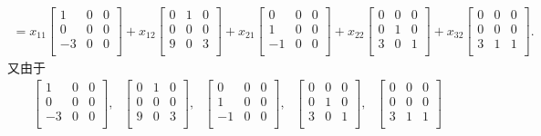 \documentclass[11pt,a4paper,openany,oneside]{book}
\begin{document}
\begin{gather*}
=x_{11}
\begin{bmatrix}
1 &  0  &  0  \\
0 &  0  &  0  \\
-3 &  0  &  0  \\
\end{bmatrix}
+x_{12}
\begin{bmatrix}
0 &  1  &  0  \\
0 &  0  &  0  \\
9 &  0  &  3  \\
\end{bmatrix}
+x_{21}
\begin{bmatrix}
0 &  0  &  0  \\
1 &  0  &  0  \\
-1&  0  &  0  \\
\end{bmatrix}
+x_{22}
\begin{bmatrix}
0 &  0  &  0  \\
0 &  1  &  0  \\
3 &  0  &  1  \\
\end{bmatrix}
+x_{32}
\begin{bmatrix}
0 &  0  &  0  \\
0 &  0  &  0  \\
3 &  1  &  1  \\
\end{bmatrix}.
\end{gather*}
又由于
\begin{gather*}
\begin{bmatrix}
1 &  0  &  0  \\
0 &  0  &  0  \\
-3 &  0  &  0  \\
\end{bmatrix},
\ \ \ 
\begin{bmatrix}
0 &  1  &  0  \\
0 &  0  &  0  \\
9 &  0  &  3  \\
\end{bmatrix},
\ \ \ 
\begin{bmatrix}
0 &  0  &  0  \\
1 &  0  &  0  \\
-1&  0  &  0  \\
\end{bmatrix},
\ \ \ 
\begin{bmatrix}
0 &  0  &  0  \\
0 &  1  &  0  \\
3 &  0  &  1  \\
\end{bmatrix},
\ \ \ 
\begin{bmatrix}
0 &  0  &  0  \\
0 &  0  &  0  \\
3 &  1  &  1  \\
\end{bmatrix}
\end{gather*}
\end{document}
